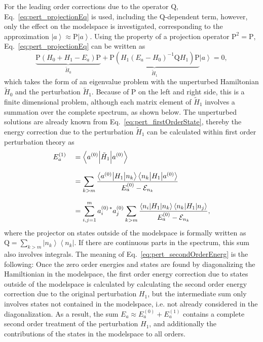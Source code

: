 For the leading order corrections due to the operator $\text{Q}$, Eq.~\eqref{eq:pert_projectionEq} is used, including the Q-dependent term, however, only the effect on the modelspace is investigated, corresponding to the approximation $\left|a\right> \approx \text{P}\left|a\right>$. Using the property of a projection operator $\text{P}^2=\text{P}$, Eq.~\eqref{eq:pert_projectionEq} can be written as
\begin{equation}
\label{eq:pert_secondOrder}
 \underbrace{\text{P}(H_0+H_1-E_a)\text{P}}_{\tilde{H}_0} + \underbrace{\text{P}(H_1(E_a-H_0)^{-1}\text{Q}H_1)\text{P}}_{\tilde{H}_1} \left|a\right> = 0,
\end{equation}
which takes the form of an eigenvalue problem with the unperturbed Hamiltonian $\tilde{H}_0$ and the perturbation $\tilde{H}_1$. Because of $\text{P}$ on the left and right side, this is a finite dimensional problem, although each matrix element of $\tilde{H}_1$ involves a summation over the complete spectrum, as shown below. The unperturbed solutions are already known from Eq.~\eqref{eq:pert_firstOrderState}, thereby the energy correction due to the perturbation $\tilde{H}_1$ can be calculated within first order perturbation theory as
\begin{alignat}{2}
\label{eq:pert_secondOrderEnerg}
&E_a^{(1)}&&= \left<a^{(0)} \middle| \tilde{H}_1 \middle| a^{(0)} \right>\\[7.5pt]
& &&= \sum_{k>m} \frac{\left<a^{(0)}\middle|H_1\middle|n_k\right>\left<n_k\middle|H_1\middle|a^{(0)}\right>}{E_a^{(0)}-\mathcal{E}_{n_k}}\\[7.5pt]
& &&= \sum_{i,j=1}^m a_i^{(0)\,*}a_j^{(0)} \sum_{k>m} \frac{\left<n_i\middle|H_1\middle|n_k\right>\left<n_k\middle|H_1\middle|n_j\right>}{E_a^{(0)}-\mathcal{E}_{n_k}}\notag,
\end{alignat}
where the projector on states outside of the modelspace is formally written as $\text{Q}=\sum_{k>m}\left|n_k\right>\left<n_k\right|$. If there are continuous parts in the spectrum, this sum also involves integrals. The meaning of Eq.~\eqref{eq:pert_secondOrderEnerg} is the following: Once the zero order energies and states are found by diagonalizing the Hamiltionian in the modelspace, the first order energy correction due to states outside of the modelspace is calculated by calculating the second order energy correction due to the original perturbation $H_1$, but the intermediate sum only involves states not contained in the modelspace, i.e. not already considered in the diagonalization. As a result, the sum $E_a\approx E_a^{(0)}+E_a^{(1)}$ contains a complete second order treatment of the perturbation $H_1$, and additionally the contributions of the states in the modelspace to all orders.

